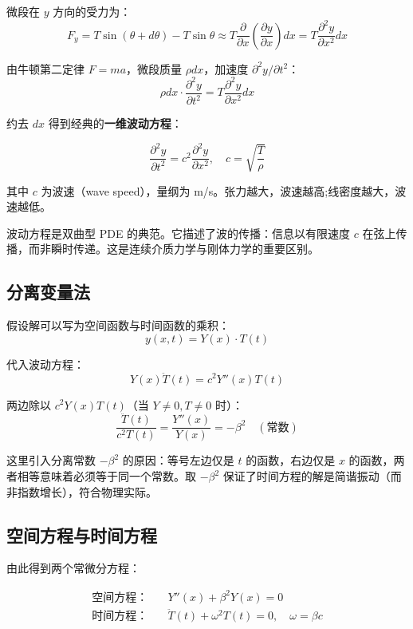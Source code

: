 微段在 $y$ 方向的受力为：
\[
F_y = T\sin(\theta + d\theta) - T\sin\theta \approx T\frac{\partial}{\partial x}\left(\frac{\partial y}{\partial x}\right)dx = T\frac{\partial^2 y}{\partial x^2}dx
\]

由牛顿第二定律 $F = ma$，微段质量 $\rho dx$，加速度 $\partial^2 y/\partial t^2$：
\[
\rho dx \cdot \frac{\partial^2 y}{\partial t^2} = T\frac{\partial^2 y}{\partial x^2}dx
\]

约去 $dx$ 得到经典的\textbf{一维波动方程}：

\begin{myformula}
\[
\frac{\partial^2 y}{\partial t^2} = c^2\frac{\partial^2 y}{\partial x^2}, \quad c = \sqrt{\frac{T}{\rho}}
\]
\end{myformula}

其中 $c$ 为波速（wave speed），量纲为 m/s。张力越大，波速越高;线密度越大，波速越低。

\begin{remark}
波动方程是双曲型 PDE 的典范。它描述了波的传播：信息以有限速度 $c$ 在弦上传播，而非瞬时传递。这是连续介质力学与刚体力学的重要区别。
\end{remark}

\subsection{分离变量法}

假设解可以写为空间函数与时间函数的乘积：
\[
y(x,t) = Y(x) \cdot T(t)
\]

代入波动方程：
\[
Y(x)\ddot{T}(t) = c^2 Y''(x) T(t)
\]

两边除以 $c^2 Y(x) T(t)$（当 $Y\neq0, T\neq0$ 时）：
\[
\frac{\ddot{T}(t)}{c^2 T(t)} = \frac{Y''(x)}{Y(x)} = -\beta^2 \quad (\text{常数})
\]

这里引入分离常数 $-\beta^2$ 的原因：等号左边仅是 $t$ 的函数，右边仅是 $x$ 的函数，两者相等意味着必须等于同一个常数。取 $-\beta^2$ 保证了时间方程的解是简谐振动（而非指数增长），符合物理实际。

\subsection{空间方程与时间方程}

由此得到两个常微分方程：

\begin{myformula}
\[\begin{aligned}
\text{空间方程：}\quad & Y''(x) + \beta^2 Y(x) = 0 \\
\text{时间方程：}\quad & \ddot{T}(t) + \omega^2 T(t) = 0, \quad \omega = \beta c
\end{aligned}\]
\end{myformula}

